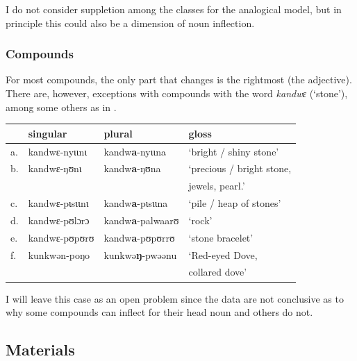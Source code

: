 I do not consider suppletion among the classes for the analogical model, but in principle this could also be a dimension of noun inflection.

\subsubsection{Compounds}

For most compounds, the only part that changes is the rightmost (the adjective). There are, however, exceptions with compounds with the word \textit{kandwɛ} (`stone'), among some others as in .

\begin{exe}
    \ex \label{except-stone}
    \begin{tabular}[t]{llll}
         & singular       & plural                   & gloss                          \\
      \midrule
      a. & kandwɛ-nyɩɩnɩ  & kandw\textbf{a}-nyɩɩna   & `bright / shiny stone'         \\
      b. & kandwɛ-ŋʊnɩ    & kandw\textbf{a}-ŋʊna     & `precious / bright stone,       \\
         &                &                          & jewels, pearl.'              \\
      c. & kandwɛ-pɩsɩɩnɩ & kandw\textbf{a}-pɩsɩɩna  & `pile / heap of stones'        \\
      d. & kandwɛ-pʊlɔrɔ  & kandw\textbf{a}-palwaarʊ & `rock'                         \\
      e. & kandwɛ-pʊpʊrʊ  & kandw\textbf{a}-pʊpʊrrʊ  & `stone bracelet'               \\
      f. & kunkwən-poŋo   & kunkwə\textbf{ŋ}-pwəənu  & `Red-eyed Dove,\\
      &&&  collared dove' \\
    \end{tabular}
\end{exe}

I will leave this case as an open problem since the data are not conclusive as to why some compounds can inflect for their head noun and others do not.

\subsection{Materials}

